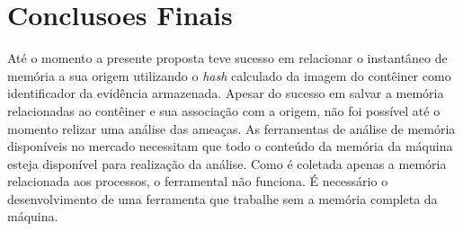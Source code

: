 \documentclass[conference]{IEEEtran}
\begin{document}
\section{Conclusoes Finais}
\label{sec:conclusion}

Até o momento a presente proposta teve sucesso em relacionar o instantâneo de memória a sua origem utilizando o \textit{hash} calculado da imagem do contêiner como identificador da evidência armazenada. 
%
Apesar do sucesso em salvar a memória relacionadas ao contêiner e sua associação com a origem, não foi possível até o momento relizar uma análise das ameaças. 
%
As ferramentas de análise de memória disponíveis no mercado necessitam que todo o conteúdo da memória da máquina esteja disponível para realização da análise. 
%
Como é coletada apenas a memória relacionada aos processos, o ferramental não funciona. 
%
É necessário o desenvolvimento de uma ferramenta que trabalhe sem a memória completa da máquina.






\end{document}
